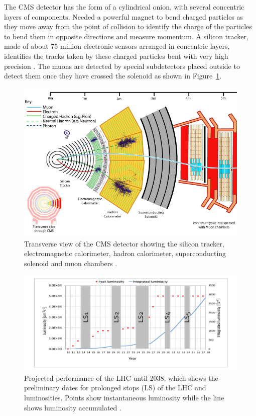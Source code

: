 \documentclass[final,3p]{CSP}
\begin{document}
The CMS detector has the form of a cylindrical onion, with several concentric layers of components. Needed a powerful magnet to bend charged particles as they move away from the point of collision to identify the charge of the particles to bend them in opposite directions and measure momentum. A silicon tracker, made of about 75 
million electronic sensors arranged in concentric layers, identifies the tracks taken by these charged particles bent with very high precision \cite{Chatrchyan:2008aa}. The muons are detected by special subdetectors placed outside to detect them once they have crossed the solenoid as shown in Figure~\ref{figure5}.

  \begin{figure}[H]
    \centering
    \includegraphics[width=0.6\columnwidth]{./cms12.png}
    \caption{Transverse view of the CMS detector showing the silicon tracker, electromagnetic calorimeter, hadron calorimeter, superconducting solenoid and muon chambers \cite{Chatrchyan:2008aa}.}
    \label{figure5}
  \end{figure}
  
  \begin{figure}[H]
    \centering
    \includegraphics[width=0.9\columnwidth]{./lum6.png}
    \caption{Projected performance of the LHC until 2038, which shows the preliminary dates for prolonged stops (LS) of the LHC and luminosities. Points show instantaneous luminosity while the line shows luminosity accumulated \cite{collaborations2019report}.}
    \label{figure6}
  \end{figure}
\end{document}
